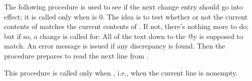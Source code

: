 The following procedure is used to see if the next change entry should
go into effect; it is called only when  is 0.
The idea is to test whether or not the current
contents of  matches the current contents of .
If not, there's nothing more to do; but if so, a change is called for:
All of the text down to the \.{@y} is supposed to match. An error
message is issued if any discrepancy is found. Then the procedure
prepares to read the next line from .

This procedure is called only when , i.e., when the
current line is nonempty.

